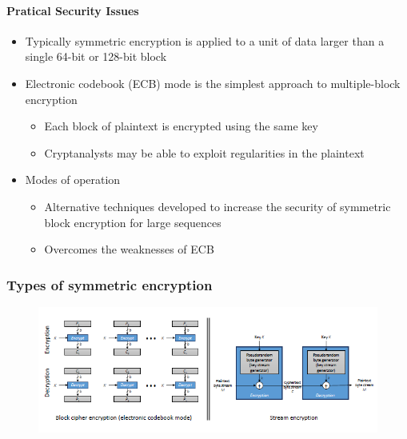 \documentclass{article}
\begin{document}
                            \paragraph{Pratical Security Issues}
                            \begin{itemize}
                                \item Typically symmetric encryption is applied to a unit of data larger than a single 64-bit or 128-bit block
                                \item Electronic codebook (ECB) mode is the simplest approach to multiple-block encryption
                                \begin{itemize}
                                    \item Each block of plaintext is encrypted using the same key
                                    \item Cryptanalysts may be able to exploit regularities in the plaintext
                                \end{itemize}
                                \item Modes of operation
                                \begin{itemize}
                                    \item Alternative techniques developed to increase the security of symmetric block encryption for large sequences
                                    \item Overcomes the weaknesses of ECB
                                \end{itemize}
                            \end{itemize}        
                        \subsubsection{Types of symmetric encryption}
                            
                            \begin{figure}[h]
                                \includegraphics{../immagini/Types_of_symmetric_encryption.png}
                            \end{figure}
\end{document}
